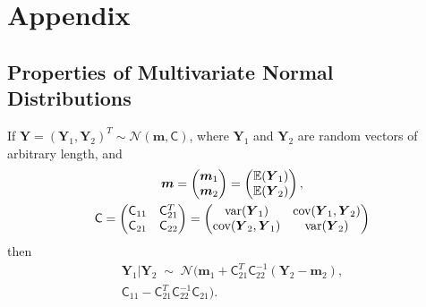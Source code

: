 \documentclass[twocolumn]{svjour3}          %
\newcommand{\bm}[1]{\boldsymbol{#1}}
\newcommand{\Ex}{\mathbb{E}}
\newcommand{\vm}{\bm{m}}
\newcommand{\vY}{\bm{Y}}
\newcommand{\mC}{\mathsf{C}}
\newcommand{\cov}{{\textup{cov}}}
\newcommand{\var}{{\textup{var}}}
\newcommand{\calN}{\mathcal{N}}
\begin{document}
\section{Appendix}

\subsection{Properties of Multivariate Normal Distributions}


\begin{lemma} \label{thrm:condDist} If $\vY = (\vY_1, \vY_2)^T \sim \calN (\vm,\mC)$, where $\vY_1$ and $\vY_2$ are random vectors of arbitrary length, and 
\begin{gather*}
	\vm = \begin{pmatrix} \vm_1 \\ \vm_2 \end{pmatrix} = \begin{pmatrix} \Ex(\vY_1) \\ \Ex(\vY_2) \end{pmatrix}, \\
	\mC = \begin{pmatrix}
	\mC_{11} & \mC_{21}^T \\ 	\mC_{21} & \mC_{22}
	\end{pmatrix} =
	 \begin{pmatrix}
	\var(\vY_{1}) & \cov(\vY_{1}, \vY_2) \\ 	\cov(\vY_2,\vY_{1}) & \var(\vY_{2})
	\end{pmatrix} 
	\end{gather*}
	then 
	\begin{multline*}
	\vY_1 \vert \vY_2 \; \sim \; \calN \bigl(\vm_1 + \mC_{21}^T \mC_{22}^{-1}(\vY_2 - \vm_2), \\ \mC_{11} - \mC_{21}^T \mC_{22}^{-1} \mC_{21} \bigr).
	\end{multline*}
	
\end{lemma}
\end{document}
